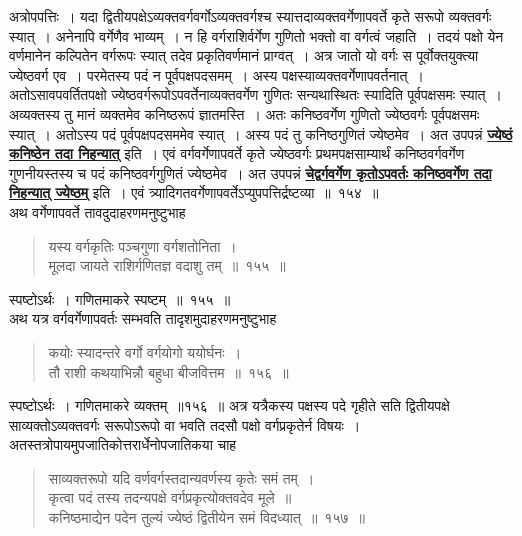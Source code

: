 \documentclass[11pt, openany]{book}
\begin{document}
\vspace{-4mm}
 अत्रोपपत्तिः~। यदा द्वितीयपक्षेऽव्यक्तवर्गवर्गोऽव्यक्तवर्गश्च
स्यात्तदाव्यक्तवर्गेणापवर्ते कृते सरूपो व्यक्तवर्गः स्यात्~। अनेनापि वर्गेणैव भाव्यम्~। न हि वर्गराशिर्वर्गेण गुणितो भक्तो वा वर्गत्वं जहाति~। तदयं पक्षो येन
वर्णमानेन कल्पितेन वर्गरूपः स्यात् तदेव प्रकृतिवर्णमानं प्राग्वत्~। अत्र जातो यो
वर्गः स पूर्वोक्तयुक्त्या ज्येष्ठवर्ग एव~। परमेतस्य पदं न पूर्वपक्षपदसमम्~। अस्य
पक्षस्याव्यक्तवर्गेणापवर्तनात्~। अतोऽसावपवर्तितपक्षो
ज्येष्ठवर्गरूपोऽपवर्तेनाव्यक्तवर्गेण गुणितः
सन्यथास्थितः स्यादिति पूर्वपक्षसमः स्यात्~। अव्यक्तस्य तु मानं
व्यक्तमेव कनिष्ठरूपं ज्ञातमस्ति~। अतः कनिष्ठवर्गेण गुणितो
ज्येष्ठवर्गः पूर्वपक्षसमः स्यात्~। अतोऽस्य पदं पूर्वपक्षपदसममेव स्यात्~।
अस्य पदं तु कनिष्ठगुणितं ज्येष्ठमेव~। अत उपपन्नं \hyperref[154]{\textbf{ज्येष्ठं कनिष्ठेन तदा निहन्यात्}} इति~। एवं वर्गवर्गेणापवर्ते कृते ज्येष्ठवर्गः
प्रथमपक्षसाम्यार्थं कनिष्ठवर्गवर्गेण गुणनीयस्तस्य च पदं कनिष्ठवर्गगुणितं ज्येष्ठमेव~। अत
उपपन्नं \hyperref[154]{\textbf{चेद्वर्गवर्गेण कृतोऽपवर्तः कनिष्ठवर्गेण तदा निहन्यात् ज्येष्ठम्}} इति~। एवं त्र्यादिगतवर्गेणापवर्तेऽप्युपपत्तिर्द्रष्टव्या~॥~१५४~॥\\

\vspace{-2mm}
 अथ वर्गेणापवर्ते तावदुदाहरणमनुष्टुभाह\textendash
\begin{quote}
    \eg
     यस्य वर्गकृतिः पञ्चगुणा वर्गशतोनिता~।\\
 मूलदा जायते राशिर्गणितज्ञ वदाशु तम्~॥~१५५~॥
\end{quote}

  स्पष्टोऽर्थः~। गणितमाकरे स्पष्टम्~॥~१५५~॥~\\

\vspace{-2mm}
 अथ यत्र वर्गवर्गेणापवर्तः सम्भवति तादृशमुदाहरणमनुष्टुभाह\textendash
 \begin{quote}
     \eg 
      कयोः स्यादन्तरे वर्गो वर्गयोगो ययोर्घनः~।\\
 तौ राशी कथयाभिन्नौ बहुधा बीजवित्तम~॥~१५६~॥

 \end{quote}

स्पष्टोऽर्थः~। गणितमाकरे व्यक्तम्~॥१५६~॥
\newpage
 अत्र यत्रैकस्य पक्षस्य पदे गृहीते सति द्वितीयपक्षे साव्यक्तोऽव्यक्तवर्गः
सरूपोऽरूपो वा भवति तदसौ पक्षो वर्गप्रकृतेर्न विषयः~।
अतस्तत्रोपायमुपजातिकोत्तरार्धेनोपजातिकया चाह\textendash

 \label{157}
\begin{quote}
    \ab 
      साव्यक्तरूपो यदि वर्णवर्गस्तदान्यवर्णस्य कृतेः समं तम्~।\\
 कृत्वा पदं तस्य तदन्यपक्षे वर्गप्रकृत्योक्तवदेव मूले~॥\\
 कनिष्ठमाद्येन पदेन तुल्यं ज्येष्ठं द्वितीयेन समं विदध्यात्~॥~१५७~॥
\end{quote}
\end{document}
